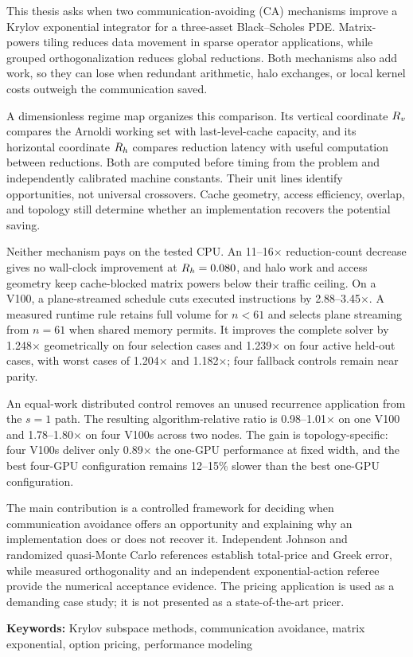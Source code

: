 
This thesis asks when two communication-avoiding (CA) mechanisms improve a
Krylov exponential integrator for a three-asset Black--Scholes PDE.
Matrix-powers tiling reduces data movement in sparse operator applications,
while grouped orthogonalization reduces global reductions. Both mechanisms
also add work, so they can lose when redundant arithmetic, halo exchanges, or
local kernel costs outweigh the communication saved.

A dimensionless regime map organizes this comparison. Its vertical coordinate
$R_v$ compares the Arnoldi working set with last-level-cache capacity, and its
horizontal coordinate $R_h$ compares reduction latency with useful computation
between reductions. Both are computed before timing from the problem and
independently calibrated machine constants. Their unit lines identify
opportunities, not universal crossovers. Cache geometry, access efficiency,
overlap, and topology still determine whether an implementation recovers the
potential saving.

Neither mechanism pays on the tested CPU. An 11--16$\times$ reduction-count
decrease gives no wall-clock improvement at $R_h=0.080$, and halo work and
access geometry keep cache-blocked matrix powers below their traffic ceiling.
On a V100, a plane-streamed schedule cuts executed instructions by
2.88--3.45$\times$. A measured runtime rule retains full volume for $n<61$ and
selects plane streaming from $n=61$ when shared memory permits. It improves the
complete solver by 1.248$\times$ geometrically on four selection cases and
1.239$\times$ on four active held-out cases, with worst cases of 1.204$\times$
and 1.182$\times$; four fallback controls remain near parity.

An equal-work distributed control removes an unused recurrence application
from the $s=1$ path. The resulting algorithm-relative ratio is
0.98--1.01$\times$ on one V100 and 1.78--1.80$\times$ on four V100s across two
nodes. The gain is topology-specific: four V100s deliver only 0.89$\times$ the
one-GPU performance at fixed width, and the best four-GPU configuration remains
12--15\% slower than the best one-GPU configuration.

The main contribution is a controlled framework for deciding when
communication avoidance offers an opportunity and explaining why an
implementation does or does not recover it. Independent Johnson and
randomized quasi-Monte Carlo references establish total-price and Greek error,
while measured orthogonality and an independent exponential-action referee
provide the numerical acceptance evidence. The pricing application is used as
a demanding case study; it is not presented as a state-of-the-art pricer.

\textbf{Keywords:} Krylov subspace methods, communication avoidance, matrix exponential, option pricing, performance modeling
